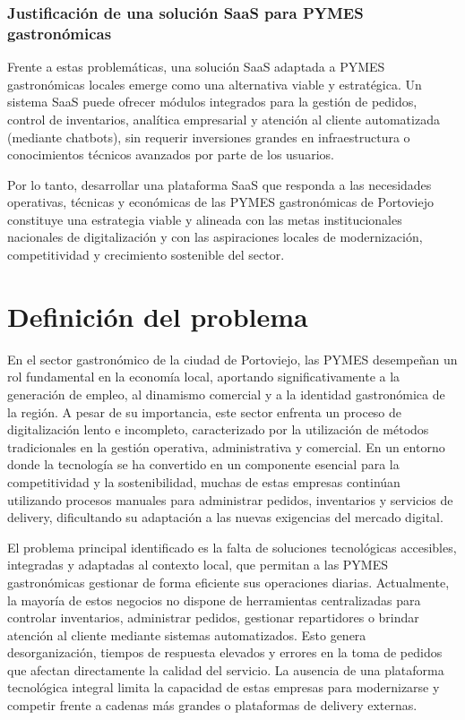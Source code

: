 \subsubsection{Justificación de una solución SaaS para PYMES gastronómicas}

Frente a estas problemáticas, una solución SaaS adaptada a PYMES gastronómicas locales emerge como una alternativa viable y estratégica. Un sistema SaaS puede ofrecer módulos integrados para la gestión de pedidos, control de inventarios, analítica empresarial y atención al cliente automatizada (mediante chatbots), sin requerir inversiones grandes en infraestructura o conocimientos técnicos avanzados por parte de los usuarios.

Por lo tanto, desarrollar una plataforma SaaS que responda a las necesidades operativas, técnicas y económicas de las PYMES gastronómicas de Portoviejo constituye una estrategia viable y alineada con las metas institucionales nacionales de digitalización y con las aspiraciones locales de modernización, competitividad y crecimiento sostenible del sector.



\section{Definición del problema}

En el sector gastronómico de la ciudad de Portoviejo, las PYMES desempeñan un rol fundamental en la economía local, aportando significativamente a la generación de empleo, al dinamismo comercial y a la identidad gastronómica de la región. A pesar de su importancia, este sector enfrenta un proceso de digitalización lento e incompleto, caracterizado por la utilización de métodos tradicionales en la gestión operativa, administrativa y comercial. En un entorno donde la tecnología se ha convertido en un componente esencial para la competitividad y la sostenibilidad, muchas de estas empresas continúan utilizando procesos manuales para administrar pedidos, inventarios y servicios de delivery, dificultando su adaptación a las nuevas exigencias del mercado digital.

El problema principal identificado es la falta de soluciones tecnológicas accesibles, integradas y adaptadas al contexto local, que permitan a las PYMES gastronómicas gestionar de forma eficiente sus operaciones diarias. Actualmente, la mayoría de estos negocios no dispone de herramientas centralizadas para controlar inventarios, administrar pedidos, gestionar repartidores o brindar atención al cliente mediante sistemas automatizados. Esto genera desorganización, tiempos de respuesta elevados y errores en la toma de pedidos que afectan directamente la calidad del servicio. La ausencia de una plataforma tecnológica integral limita la capacidad de estas empresas para modernizarse y competir frente a cadenas más grandes o plataformas de delivery externas.

